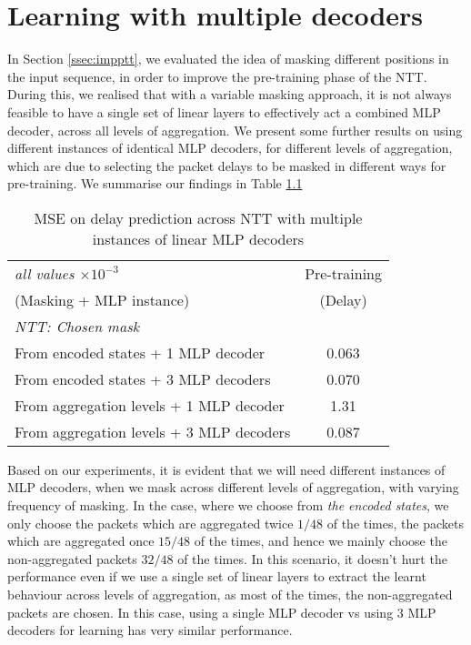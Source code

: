 \chapter{Learning with multiple decoders}
\label{app:b}

In Section \ref{ssec:impptt}, we evaluated the idea of masking different positions in the input sequence, in order to improve the pre-training phase of the NTT.  During this, we realised that with a variable masking approach, it is not always feasible to have a single set of linear layers to effectively act a combined MLP decoder, across all levels of aggregation. We present some further results on using different instances of identical MLP decoders, for different levels of aggregation, which are due to selecting the packet delays to be masked in different ways for pre-training. We summarise our findings in Table \ref{app:table2}

\begin{table}[htbp]
\centering
\begin{tabular}{ l   c  }
\toprule
\emph{all values $\times10^{-3}$} & Pre-training \\
(Masking + MLP instance) & (Delay)  \\
                                                       
\midrule
\em{NTT: Chosen mask}                                              & 		 	 \\
\smallindent From encoded states + 1 MLP decoder                                         &      0.063         \\
\smallindent From encoded states + 3 MLP decoders                                         &     0.070          \\
\smallindent From aggregation levels + 1 MLP decoder  					&     1.31          \\
\smallindent  From aggregation levels + 3 MLP decoders  					&     0.087          \\
 
    
\bottomrule

\end{tabular}
\caption{MSE on delay prediction across NTT with multiple instances of linear MLP decoders}
\label{app:table2}
\end{table}

Based on our experiments, it is evident that we will need different instances of MLP decoders, when we mask across different levels of aggregation, with varying frequency of masking. In the case, where we choose from \emph{the encoded states}, we only choose the packets which are aggregated twice $1/48$ of the times, the packets which are aggregated once $15/48$ of the times, and hence we mainly choose the non-aggregated packets \ie $32/48$ of the times. In this scenario, it doesn't hurt the performance even if we use a single set of linear layers to extract the learnt behaviour across levels of aggregation, as most of the times, the non-aggregated packets are chosen. In this case, using a single MLP decoder vs using $3$ MLP decoders for learning has very similar performance.

